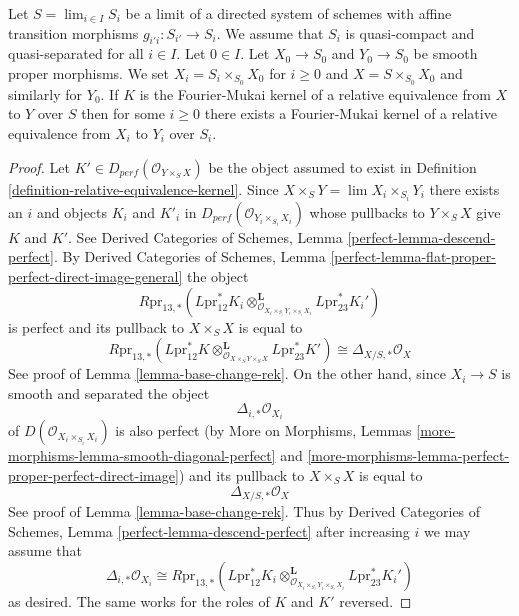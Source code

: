 \begin{lemma}
\label{lemma-descend-rek}
Let $S = \lim_{i \in I} S_i$ be a limit of a directed system of schemes
with affine transition morphisms $g_{i'i} : S_{i'} \to S_i$.
We assume that $S_i$ is quasi-compact and quasi-separated for all $i \in I$.
Let $0 \in I$. Let $X_0 \to S_0$ and $Y_0 \to S_0$ be smooth proper morphisms.
We set $X_i = S_i \times_{S_0} X_0$ for $i \geq 0$
and $X = S \times_{S_0} X_0$ and similarly for $Y_0$. If $K$ is the
Fourier-Mukai kernel of a relative equivalence from $X$ to $Y$ over $S$
then for some $i \geq 0$ there exists a
Fourier-Mukai kernel of a relative equivalence from $X_i$ to $Y_i$ over $S_i$.
\end{lemma}

\begin{proof}
Let $K' \in D_{perf}(\mathcal{O}_{Y \times_S X})$ be the object assumed to
exist in Definition \ref{definition-relative-equivalence-kernel}.
Since $X \times_S Y = \lim X_i \times_{S_i} Y_i$ there exists an
$i$ and objects $K_i$ and $K'_i$ in
$D_{perf}(\mathcal{O}_{Y_i \times_{S_i} X_i})$
whose pullbacks to $Y \times_S X$ give $K$ and $K'$.
See Derived Categories of Schemes, Lemma \ref{perfect-lemma-descend-perfect}.
By Derived Categories of Schemes, Lemma
\ref{perfect-lemma-flat-proper-perfect-direct-image-general}
the object
$$
R\text{pr}_{13, *}(L\text{pr}_{12}^*K_i
\otimes_{\mathcal{O}_{X_i \times_{S_i} Y_i \times_{S_i} X_i}}^\mathbf{L}
L\text{pr}_{23}^*K_i')
$$
is perfect and its pullback to $X \times_S X$ is equal to
$$
R\text{pr}_{13, *}(L\text{pr}_{12}^*K
\otimes_{\mathcal{O}_{X \times_S Y \times_S X}}^\mathbf{L}
L\text{pr}_{23}^*K') \cong \Delta_{X/S, *}\mathcal{O}_X
$$
See proof of Lemma \ref{lemma-base-change-rek}.
On the other hand, since $X_i \to S$ is smooth and separated the
object
$$
\Delta_{i, *}\mathcal{O}_{X_i}
$$
of $D(\mathcal{O}_{X_i \times_{S_i} X_i})$ is also perfect
(by More on Morphisms, Lemmas
\ref{more-morphisms-lemma-smooth-diagonal-perfect} and
\ref{more-morphisms-lemma-perfect-proper-perfect-direct-image}) and
its pullback to $X \times_S X$ is equal to
$$
\Delta_{X/S, *}\mathcal{O}_X
$$
See proof of Lemma \ref{lemma-base-change-rek}. Thus by
Derived Categories of Schemes, Lemma \ref{perfect-lemma-descend-perfect}
after increasing $i$ we may assume that
$$
\Delta_{i, *}\mathcal{O}_{X_i} \cong
R\text{pr}_{13, *}(L\text{pr}_{12}^*K_i
\otimes_{\mathcal{O}_{X_i \times_{S_i} Y_i \times_{S_i} X_i}}^\mathbf{L}
L\text{pr}_{23}^*K_i')
$$
as desired. The same works for the roles of $K$ and $K'$ reversed.
\end{proof}








